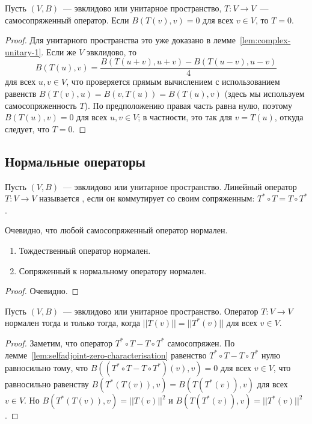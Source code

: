 \begin{lemma}\label{lem:selfadjoint-zero-characterisation}
Пусть $(V,B)$~--- эвклидово или унитарное пространство,
$T\colon V\to V$~--- самосопряженный оператор.
Если $B(T(v),v) = 0$ для всех $v\in V$, то $T=0$.
\end{lemma}
\begin{proof}
Для унитарного пространства это уже доказано
в лемме~\ref{lem:complex-unitary-1}. Если же $V$ эвклидово, то
$$
B(T(u),v) = \frac{B(T(u+v),u+v) - B(T(u-v),u-v)}{4}
$$
для всех $u,v\in V$,
что проверяется прямым вычислением с использованием
равенств $B(T(v),u) = B(v,T(u)) = B(T(u),v)$
(здесь мы используем самосопряженность $T$).
По предположению правая часть равна нулю, поэтому
$B(T(u),v)=0$ для всех $u,v\in V$; в частности, это так
для $v = T(u)$, откуда следует, что $T=0$.
\end{proof}

\subsection{Нормальные операторы}


\begin{definition}
Пусть $(V,B)$~--- эвклидово или унитарное пространство.
Линейный оператор $T\colon V\to V$ называется
, если он коммутирует со
своим сопряженным: $T^*\circ T = T\circ T^*$.
\end{definition}

\begin{remark}
Очевидно, что любой самосопряженный оператор нормален.
\end{remark}

\begin{lemma}
\begin{enumerate}
\item Тождественный оператор нормален.
\item Сопряженный к нормальному оператору нормален.
\end{enumerate}
\end{lemma} 
\begin{proof}
Очевидно.
\end{proof}

\begin{lemma}\label{prop:normal-operator-equiv}
Пусть $(V,B)$~--- эвклидово или унитарное пространство.
Оператор $T\colon V\to V$ нормален тогда и только тогда, когда
$||T(v)|| = ||T^*(v)||$ для всех $v\in V$.
\end{lemma}
\begin{proof}
Заметим, что оператор $T^*\circ T - T\circ T^*$ самосопряжен.
По лемме~\ref{lem:selfadjoint-zero-characterisation}
равенство $T^*\circ T - T\circ T^*$ нулю равносильно тому,
что $B((T^*\circ T - T\circ T^*)(v),v) = 0$ для всех $v\in V$,
что равносильно равенству
$B(T^*(T(v)),v) = B(T(T^*(v)),v)$ для всех $v\in V$.
Но $B(T^*(T(v)),v) = ||T(v)||^2$ и $B(T(T^*(v)),v) = ||T^*(v)||^2$.
\end{proof}

